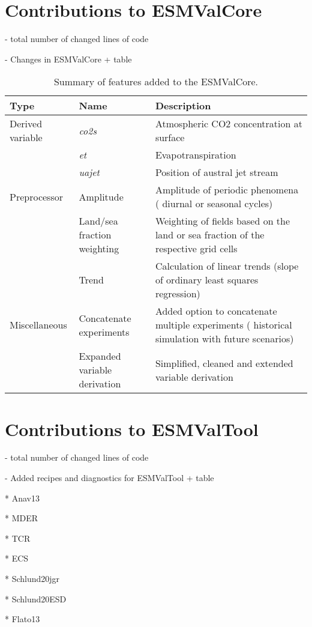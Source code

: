 \section{Contributions to \acs{ESMValCore}}
\label{sec:03:contributions_to_esmvalcore}

- total number of changed lines of code

- Changes in \ac{ESMValCore} + table

\begin{table}[t]
  \centering
  \begin{tabulary}{\columnwidth}{L L L}
    \toprule
    Type & Name & Description \\
    \midrule
    Derived variable & \emph{co2s} & Atmospheric \ac{CO2} concentration at
    surface \\
    \cmidrule(l){2-3}
    & \emph{et} & Evapotranspiration \\
    \cmidrule(l){2-3}
    & \emph{uajet} & Position of austral jet stream \\
    \midrule
    Preprocessor & Amplitude & Amplitude of periodic phenomena (\eg{} diurnal
    or seasonal cycles) \\
    \cmidrule(l){2-3}
    & Land/sea fraction weighting & Weighting of fields based on
    the land or sea fraction of the respective grid cells \\
    \cmidrule(l){2-3}
    & Trend & Calculation of linear trends (slope of ordinary least squares
    regression) \\
    \midrule
    Miscellaneous & Concatenate experiments & Added option to concatenate
    multiple experiments (\eg{} historical simulation with future scenarios) \\
    \cmidrule(l){2-3}
    & Expanded variable derivation & Simplified, cleaned and extended variable
    derivation \\
    \bottomrule
  \end{tabulary}
  \caption{Summary of features added to the \acf{ESMValCore}.}
  \label{tab:03:changes_to_esmvalcore}
\end{table}


\section{Contributions to \acs{ESMValTool}}
\label{sec:03:contributions_to_esmvaltool}

- total number of changed lines of code

- Added recipes and diagnostics for ESMValTool + table

* Anav13

* MDER

* TCR

* ECS

* Schlund20jgr

* Schlund20ESD

* Flato13
